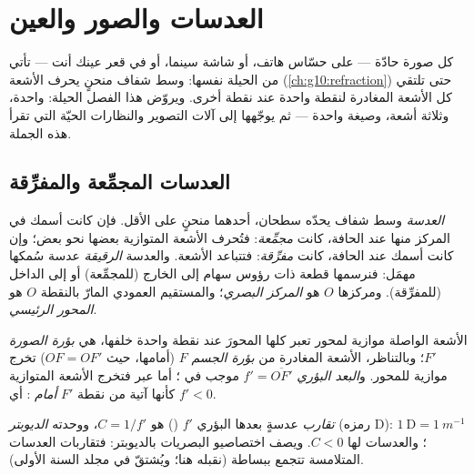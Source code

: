 \chapter{العدسات والصور والعين}\label{ch:g11:lenses-and-eye}

كل صورة حادّة --- على حسّاس هاتف، أو شاشة سينما، أو في قعر
عينك أنت --- تأتي من الحيلة نفسها: وسط شفاف منحنٍ
يحرف الأشعة  (\cref{ch:g10:refraction}) حتى تلتقي
كل الأشعة المغادرة لنقطة واحدة عند نقطة أخرى. ويروّض هذا الفصل
الحيلة:  واحدة، وثلاثة أشعة، وصيغة واحدة --- ثم يوجّهها إلى
آلات التصوير والنظارات  الحيّة التي تقرأ هذه الجملة.

\section{العدسات المجمِّعة والمفرِّقة}

\begin{definition}\label{def:g11:lenses-and-eye:lens}
\emph{العدسة} وسط شفاف يحدّه سطحان،
أحدهما منحنٍ على الأقل. فإن كانت أسمك في المركز منها عند الحافة، كانت
\emph{مجمِّعة}: فتُحرف الأشعة المتوازية
بعضها نحو بعض؛ وإن كانت أسمك عند الحافة، كانت \emph{مفرِّقة}: فتتباعد الأشعة. والعدسة \emph{الرقيقة} عدسة
سُمكها مهمَل: فنرسمها قطعة ذات رؤوس سهام إلى الخارج (للمجمِّعة) أو
إلى الداخل (للمفرِّقة). ومركزها $O$ هو \emph{المركز
البصري}؛ والمستقيم العمودي المارّ بالنقطة $O$ هو
\emph{المحور الرئيسي}.
\end{definition}

\begin{definition}\label{def:g11:lenses-and-eye:focal}
الأشعة الواصلة موازية لمحور  تعبر كلها
المحورَ عند نقطة واحدة خلفها، هي \emph{بؤرة الصورة}
$F'$؛ وبالتناظر، الأشعة المغادرة من \emph{بؤرة الجسم}
$F$ (أمامها، حيث $OF = OF'$) تخرج موازية للمحور. و\emph{البعد
البؤري} $f' = \overline{OF'}$
موجب في ؛ أما عبر  فتخرج الأشعة المتوازية
كأنها آتية من نقطة $F'$ \emph{أمام} : أي $f' < 0$.
\end{definition}

\begin{definition}[التقارب]\label{def:g11:lenses-and-eye:vergence}
\emph{تقارب} عدسةٍ بعدها البؤري $f'$
() هو $C = 1/f'$،
ووحدته \emph{الديوبتر} (رمزه D):
$1~\text{D} = \qty{1}{m^{-1}}$؛ والعدسات  لها $C < 0$.
ويصف اختصاصيو البصريات بالديوبتر: فتقاربات العدسات  المتلامسة
تتجمع ببساطة (نقبله هنا؛ ويُشتقّ في مجلد السنة الأولى).
\end{definition}


